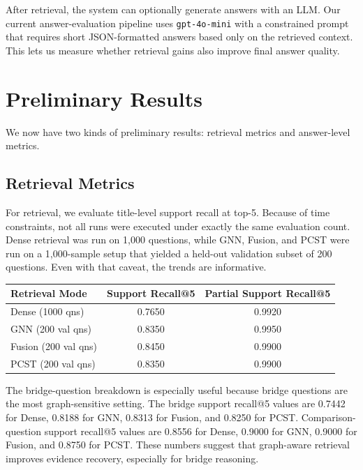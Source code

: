 \documentclass[10pt]{article}
\begin{document}
After retrieval, the system can optionally generate answers with an LLM. Our current answer-evaluation pipeline uses \texttt{gpt-4o-mini} with a constrained prompt that requires short JSON-formatted answers based only on the retrieved context. This lets us measure whether retrieval gains also improve final answer quality.

\section{Preliminary Results}

We now have two kinds of preliminary results: retrieval metrics and answer-level metrics.

\subsection{Retrieval Metrics}

For retrieval, we evaluate title-level support recall at top-5. Because of time constraints, not all runs were executed under exactly the same evaluation count. Dense retrieval was run on 1{,}000 questions, while GNN, Fusion, and PCST were run on a 1{,}000-sample setup that yielded a held-out validation subset of 200 questions. Even with that caveat, the trends are informative.

\begin{center}
\begin{tabular}{lcc}
\toprule
\textbf{Retrieval Mode} & \textbf{Support Recall@5} & \textbf{Partial Support Recall@5} \\
\midrule
Dense (1000 qns) & 0.7650 & 0.9920 \\
GNN (200 val qns) & 0.8350 & 0.9950 \\
Fusion (200 val qns) & 0.8450 & 0.9900 \\
PCST (200 val qns) & 0.8350 & 0.9900 \\
\bottomrule
\end{tabular}
\end{center}

The bridge-question breakdown is especially useful because bridge questions are the most graph-sensitive setting. The bridge support recall@5 values are 0.7442 for Dense, 0.8188 for GNN, 0.8313 for Fusion, and 0.8250 for PCST. Comparison-question support recall@5 values are 0.8556 for Dense, 0.9000 for GNN, 0.9000 for Fusion, and 0.8750 for PCST. These numbers suggest that graph-aware retrieval improves evidence recovery, especially for bridge reasoning.
\end{document}

